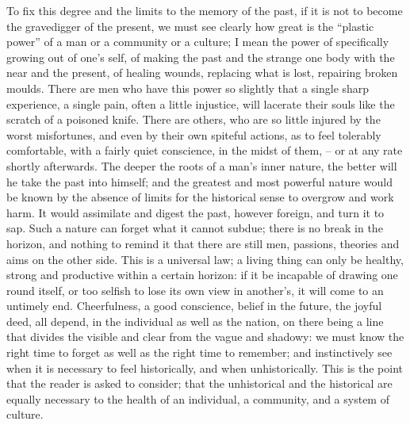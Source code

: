 To fix this degree and the limits to the memory of the past, if it is
not to become the gravedigger of the present, we must see clearly how
great is the \enquote{plastic power} of a man or a community or a culture; I
mean the power of specifically growing out of one's self, of making
the past and the strange one body with the near and the present, of
healing wounds, replacing what is lost, repairing broken moulds.
There are men who have this power so slightly that a single sharp
experience, a single pain, often a little injustice, will lacerate
their souls like the scratch of a poisoned knife. There are others,
who are so little injured by the worst misfortunes, and even by their
own spiteful actions, as to feel tolerably comfortable, with a fairly
quiet conscience, in the midst of them, -- or at any rate shortly
afterwards. The deeper the roots of a man's inner nature, the better
will he take the past into himself; and the greatest and most
powerful nature would be known by the absence of limits for the
historical sense to overgrow and work harm. It would assimilate and
digest the past, however foreign, and turn it to sap. Such a nature
can forget what it cannot subdue; there is no break in the horizon,
and nothing to remind it that there are still men, passions, theories
and aims on the other side. This is a universal law; a living thing
can only be healthy, strong and productive within a certain horizon:
if it be incapable of drawing one round itself, or too selfish to
lose its own view in another's, it will come to an untimely end.
Cheerfulness, a good conscience, belief in the future, the joyful
deed, all depend, in the individual as well as the nation, on there
being a line that divides the visible and clear from the vague and
shadowy: we must know the right time to forget as well as the right
time to remember; and instinctively see when it is necessary to feel
historically, and when unhistorically. This is the point that the
reader is asked to consider; that the unhistorical and the historical
are equally necessary to the health of an individual, a community,
and a system of culture.

